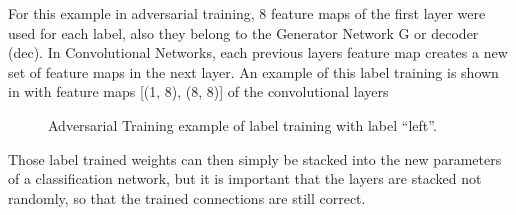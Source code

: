 For this example in adversarial training, 8 feature maps of the first layer were used for each label, also they belong to the Generator Network G or decoder (dec). In Convolutional Networks, each previous layers feature map creates a new set of feature maps in the next layer.
An example of this label training is shown in  with feature maps [(1, 8), (8, 8)] of the convolutional layers

\begin{figure}[!ht]
  \centering
  \caption{Adversarial Training example of label training with label \enquote{left}.}
  \label{fig:ml_adv_example_label}
\end{figure}
\FloatBarrier
\noindent

Those label trained weights can then simply be stacked into the new parameters of a classification network, but it is important that the layers are stacked not randomly, so that the trained connections are still correct.







